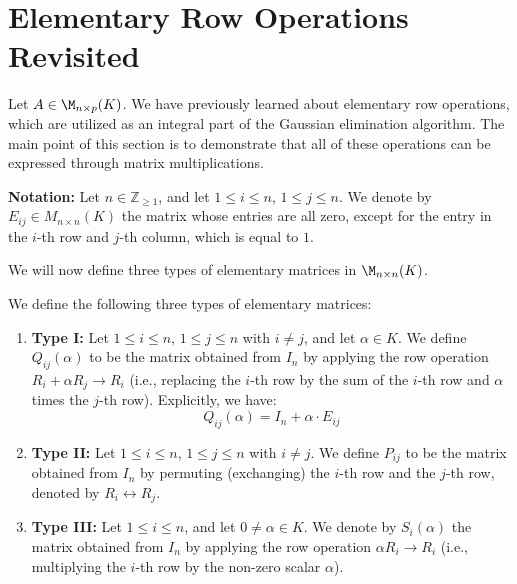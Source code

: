 \section{Elementary Row Operations Revisited}

Let $A \in \M_{n \times p}(K)$. We have previously learned about elementary row operations, which are utilized as an integral part of the Gaussian elimination algorithm. The main point of this section is to demonstrate that all of these operations can be expressed through matrix multiplications.

\textbf{Notation:} Let $n \in \mathbb{Z}_{\ge 1}$, and let $1 \le i \le n$, $1 \le j \le n$. We denote by $E_{ij} \in M_{n \times n}(K)$ the matrix whose entries are all zero, except for the entry in the $i$-th row and $j$-th column, which is equal to $1$. 

We will now define three types of elementary matrices in $\M_{n \times n}(K)$.

\begin{definition}
\label{def:elementary_matrices}
We define the following three types of elementary matrices:
\begin{enumerate}
    \item \textbf{Type I:} Let $1 \le i \le n$, $1 \le j \le n$ with $i \neq j$, and let $\alpha \in K$. We define $Q_{ij}(\alpha)$ to be the matrix obtained from $I_n$ by applying the row operation $R_i + \alpha R_j \longrightarrow R_i$ (i.e., replacing the $i$-th row by the sum of the $i$-th row and $\alpha$ times the $j$-th row). Explicitly, we have:
    \begin{equation*}
        Q_{ij}(\alpha) = I_n + \alpha \cdot E_{ij}
    \end{equation*}
    
    \item \textbf{Type II:} Let $1 \le i \le n$, $1 \le j \le n$ with $i \neq j$. We define $P_{ij}$ to be the matrix obtained from $I_n$ by permuting (exchanging) the $i$-th row and the $j$-th row, denoted by $R_i \leftrightarrow R_j$.
    
    \item \textbf{Type III:} Let $1 \le i \le n$, and let $0 \neq \alpha \in K$. We denote by $S_i(\alpha)$ the matrix obtained from $I_n$ by applying the row operation $\alpha R_i \longrightarrow R_i$ (i.e., multiplying the $i$-th row by the non-zero scalar $\alpha$).
\end{enumerate}
\end{definition}

